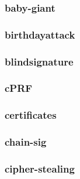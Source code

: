 \begin{frame}\frametitle{baby-giant}
\begin{figure}
\begin{center}

\end{center}
\end{figure}
\end{frame}
\begin{frame}\frametitle{birthdayattack}
\begin{figure}
\begin{center}

\end{center}
\end{figure}
\end{frame}
\begin{frame}\frametitle{blindsignature}
\begin{figure}
\begin{center}

\end{center}
\end{figure}
\end{frame}
\begin{frame}\frametitle{cPRF}
\begin{figure}
\begin{center}

\end{center}
\end{figure}
\end{frame}
\begin{frame}\frametitle{certificates}
\begin{figure}
\begin{center}

\end{center}
\end{figure}
\end{frame}
\begin{frame}\frametitle{chain-sig}
\begin{figure}
\begin{center}

\end{center}
\end{figure}
\end{frame}
\begin{frame}\frametitle{cipher-stealing}
\begin{figure}
\begin{center}

\end{center}
\end{figure}
\end{frame}
